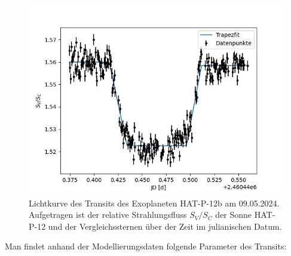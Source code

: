 \documentclass[ngerman,ruledheaders=section,class=report,thesis={type=Protokoll},accentcolor=1b,marginpar=false,parskip=half-,fontsize=11pt,]{tudapub}
\begin{document}
	\begin{figure}[h!]
		\centering
		\includegraphics{Exoplanet_Trapez_Fit.jpg}
		\caption{Lichtkurve des Transits des Exoplaneten HAT-P-12b am 09.05.2024. Aufgetragen ist der relative Strahlungsfluss $S_V / S_C$ der Sonne HAT-P-12 und der Vergleichssternen über der Zeit im julianischen Datum.}
		\label{Abbildung 4.6}
	\end{figure}
	
	Man findet anhand der Modellierungsdaten folgende Parameter des Transits:
	
\end{document}
